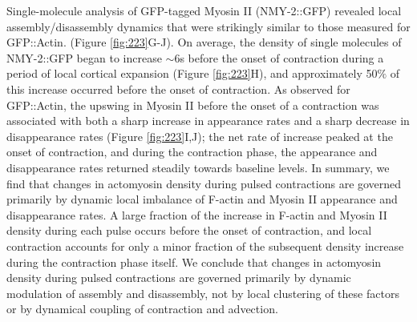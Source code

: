 Single-molecule analysis of GFP-tagged Myosin II (NMY-2::GFP) revealed local assembly/disassembly dynamics that were strikingly similar to those measured for GFP::Actin. (Figure \ref{fig:223}G-J). On average, the density of single molecules of NMY-2::GFP began to increase $\sim$6s before the onset of contraction during a period of local cortical expansion (Figure \ref{fig:223}H), and approximately 50$\%$ of this increase occurred before the onset of contraction. As observed for GFP::Actin, the upswing in Myosin II before the onset of a contraction was associated with both a sharp increase in appearance rates and a sharp decrease in disappearance rates (Figure \ref{fig:223}I,J); the net rate of increase peaked at the onset of contraction, and during the contraction phase, the appearance and disappearance rates returned steadily towards baseline levels.
In summary, we find that changes in actomyosin density during pulsed contractions are governed primarily by dynamic local imbalance of F-actin and Myosin II appearance and disappearance rates. A large fraction of the increase in F-actin and Myosin II density during each pulse occurs before the onset of contraction, and local contraction accounts for only a minor fraction of the subsequent density increase during the contraction phase itself. We conclude that changes in actomyosin density during pulsed contractions are governed primarily by dynamic modulation of assembly and disassembly, not by local clustering of these factors or by dynamical coupling of contraction and advection.


